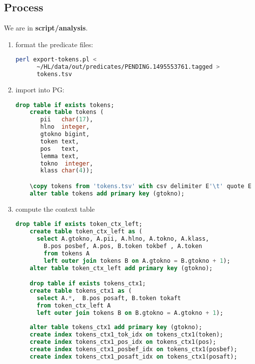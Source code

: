 \documentclass[a4paper,11pt]{report}
\newcommand{\cs}[1]{{\bfseries \ttfamily #1}}
\begin{document}
\subsection*{Process}
We are in \cs{script/analysis}.
\begin{enumerate}
\item format the predicate files:
  \begin{lstlisting}[language=Bash]
    perl export-tokens.pl <
      ~/HL/data/out/predicates/PENDING.1495553761.tagged >
      tokens.tsv
  \end{lstlisting}
\item import into PG:
  \begin{lstlisting}[language=SQL]
    drop table if exists tokens;
    create table tokens (
       pii   char(17),
       hlno  integer,
       gtokno bigint,
       token text,
       pos   text,
       lemma text,
       tokno  integer,
       klass char(4));

    \copy tokens from 'tokens.tsv' with csv delimiter E'\t' quote E'\b';
    alter table tokens add primary key (gtokno);
  \end{lstlisting}
\item compute the context table
  \begin{lstlisting}[language=SQL]
    drop table if exists token_ctx_left;
    create table token_ctx_left as (
      select A.gtokno, A.pii, A.hlno, A.tokno, A.klass,
        B.pos posbef, A.pos, B.token tokbef , A.token
        from tokens A
        left outer join tokens B on A.gtokno = B.gtokno + 1);
    alter table token_ctx_left add primary key (gtokno);

    drop table if exists tokens_ctx1;
    create table tokens_ctx1 as (
      select A.*,  B.pos posaft, B.token tokaft
      from token_ctx_left A
      left outer join tokens B on B.gtokno = A.gtokno + 1);
      
    alter table tokens_ctx1 add primary key (gtokno);
    create index tokens_ctx1_tok_idx on tokens_ctx1(token);
    create index tokens_ctx1_pos_idx on tokens_ctx1(pos);
    create index tokens_ctx1_posbef_idx on tokens_ctx1(posbef);
    create index tokens_ctx1_posaft_idx on tokens_ctx1(posaft);


\end{lstlisting}
\end{enumerate}
\end{document}
